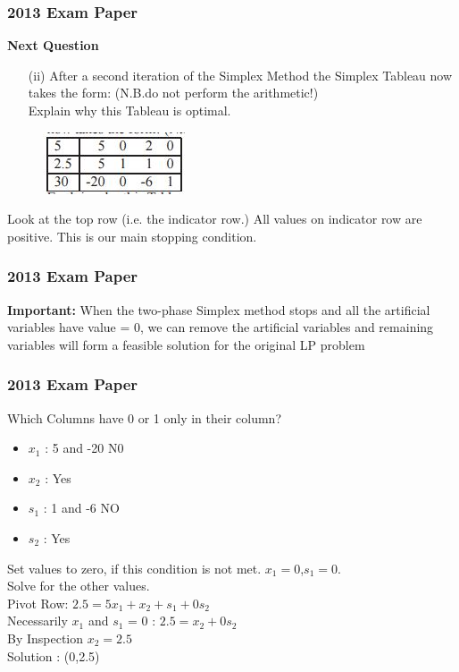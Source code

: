 \documentclass{beamer}
\begin{document}
\begin{frame}
\frametitle{2013 Exam Paper}
\large
\noindent \textbf{Next Question}
\begin{itemize}
\item[(ii)] After a second iteration of the Simplex Method the Simplex Tableau
now takes the form: (N.B.do not perform the arithmetic!) \\ Explain why this Tableau is optimal. 
\end{itemize}

\begin{figure}
\centering
\includegraphics[width=0.7\linewidth]{exam13-b}
\end{figure}

Look at the top row (i.e. the indicator row.) All values on indicator row are positive. This is our main stopping condition.

\end{frame}
\begin{frame}
\frametitle{2013 Exam Paper}
\large
\noindent \textbf{Important:} When the two-phase Simplex method stops and all the artificial variables have value = 0, we can remove the artificial variables and remaining variables will form a feasible solution for the original LP problem
\end{frame}
\begin{frame}
\frametitle{2013 Exam Paper}
\large
Which Columns have 0 or 1 only in their column?
\begin{itemize}
	\item $x_1$ : 5 and -20 N0
	\item $x_2$ : Yes
	\item $s_1$ : 1 and -6 NO
	\item $s_2$ : Yes
\end{itemize}
Set values to zero, if this condition is not met. $x_1=0$,$s_1=0$.\\ \bigskip
Solve for the other values.\\
Pivot Row: $2.5 = 5x_1 + x_2 + s_1 + 0s_2$ \\
Necessarily $x_1$ and $s_1$ = 0 :  $2.5 =  x_2 + 0s_2$ \\
By Inspection $x_2=2.5$ \\
Solution : (0,2.5)	\\
\end{frame}
\end{document}
